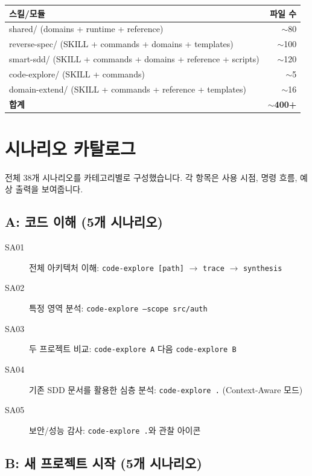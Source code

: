 \documentclass[11pt,a4paper,openright,twoside]{report}
\begin{document}
\begin{table}[H]
\centering
\begin{tabular}{lr}
\toprule
\textbf{스킬/모듈} & \textbf{파일 수} \\
\midrule
shared/ (domains + runtime + reference) & $\sim$80 \\
reverse-spec/ (SKILL + commands + domains + templates) & $\sim$100 \\
smart-sdd/ (SKILL + commands + domains + reference + scripts) & $\sim$120 \\
code-explore/ (SKILL + commands) & $\sim$5 \\
domain-extend/ (SKILL + commands + reference + templates) & $\sim$16 \\
\midrule
\textbf{합계} & $\sim$\textbf{400+} \\
\bottomrule
\end{tabular}
\end{table}


\chapter{시나리오 카탈로그}
\label{app:scenarios}

전체 38개 시나리오를 카테고리별로 구성했습니다. 각 항목은 사용 시점, 명령 흐름, 예상 출력을 보여줍니다.

\section{A: 코드 이해 (5개 시나리오)}

\begin{description}
  \item[SA01] 전체 아키텍처 이해: \texttt{code-explore [path]} $\rightarrow$ \texttt{trace} $\rightarrow$ \texttt{synthesis}
  \item[SA02] 특정 영역 분석: \texttt{code-explore --scope src/auth}
  \item[SA03] 두 프로젝트 비교: \texttt{code-explore A} 다음 \texttt{code-explore B}
  \item[SA04] 기존 SDD 문서를 활용한 심층 분석: \texttt{code-explore .} (Context-Aware 모드)
  \item[SA05] 보안/성능 감사: \texttt{code-explore .}와 관찰 아이콘
\end{description}

\section{B: 새 프로젝트 시작 (5개 시나리오)}
\end{document}
